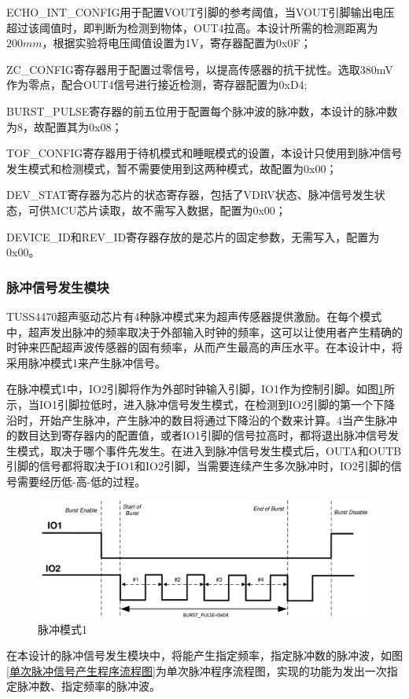     ECHO\_INT\_CONFIG用于配置VOUT引脚的参考阈值，当VOUT引脚输出电压超过该阈值时，即判断为检测到物体，OUT4拉高。本设计所需的检测距离为$200mm$，根据实验将电压阈值设置为1V，寄存器配置为0x0F；\par
    ZC\_CONFIG寄存器用于配置过零信号，以提高传感器的抗干扰性。选取380mV作为零点，配合OUT4信号进行接近检测，寄存器配置为0xD4;\par
    BURST\_PULSE寄存器的前五位用于配置每个脉冲波的脉冲数，本设计的脉冲数为8，故配置其为0x08；\par
    TOF\_CONFIG寄存器用于待机模式和睡眠模式的设置，本设计只使用到脉冲信号发生模式和检测模式，暂不需要使用到这两种模式，故配置为0x00；\par
    DEV\_STAT寄存器为芯片的状态寄存器，包括了VDRV状态、脉冲信号发生状态，可供MCU芯片读取，故不需写入数据，配置为0x00；\par
    DEVICE\_ID和REV\_ID寄存器存放的是芯片的固定参数，无需写入，配置为0x00。
    
    \subsubsection{脉冲信号发生模块}
    TUSS4470超声驱动芯片有4种脉冲模式来为超声传感器提供激励。在每个模式中，超声发出脉冲的频率取决于外部输入时钟的频率，这可以让使用者产生精确的时钟来匹配超声波传感器的固有频率，从而产生最高的声压水平。在本设计中，将采用脉冲模式1来产生脉冲信号。\par
    在脉冲模式1中，IO2引脚将作为外部时钟输入引脚，IO1作为控制引脚。如图\ref{脉冲模式1}所示，当IO1引脚拉低时，进入脉冲信号发生模式，在检测到IO2引脚的第一个下降沿时，开始产生脉冲，产生脉冲的数目将通过下降沿的个数来计算。4当产生脉冲的数目达到寄存器内的配置值，或者IO1引脚的信号拉高时，都将退出脉冲信号发生模式，取决于哪个事件先发生。在进入到脉冲信号发生模式后，OUTA和OUTB引脚的信号都将取决于IO1和IO2引脚，当需要连续产生多次脉冲时，IO2引脚的信号需要经历低-高-低的过程。
     \begin{figure}[ht]
        \centering
        \includegraphics[width=12cm]{figure/IO MODE1.png}
        \caption{脉冲模式1}
        \label{脉冲模式1}
    \end{figure}
    在本设计的脉冲信号发生模块中，将能产生指定频率，指定脉冲数的脉冲波，如图\ref{单次脉冲信号产生程序流程图}为单次脉冲程序流程图，实现的功能为发出一次指定脉冲数、指定频率的脉冲波。
    
